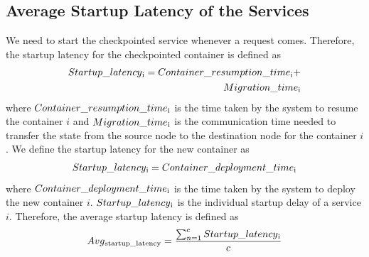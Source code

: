 \subsection{Average Startup Latency of the Services}
We need to start the checkpointed service whenever a
request comes. Therefore, the startup latency for the checkpointed container is defined as
\begin{align*} Startup\_latency\textsubscript{i} = Container\_resumption\_time\textsubscript{i}+
\\ Migration\_time\textsubscript{i}\end{align*}
where \begin{math} Container\_resumption\_time\textsubscript{i}\end{math} is the time taken by
the system to resume the container \begin{math} i \end{math} and \begin{math} Migration\_time\textsubscript{i} \end{math} is the communication time needed to transfer the state from
the source node to the destination node for the container \begin{math}i \end{math}. We define the startup latency for the new container as \begin{align*} Startup\_latency\textsubscript{i} = Container\_deployment\_time\textsubscript{i}\end{align*} where \begin{math} Container\_deployment\_time\textsubscript{i} \end{math} is the time taken by
the system to deploy the new container \begin{math} i \end{math}. \begin{math}Startup\_latency\textsubscript{i} \end{math} is the individual startup delay of a service \begin{math} i \end{math}. Therefore, the
average startup latency is defined as \begin{align*} Avg\textsubscript{startup\_latency} =\frac {\sum_{n=1}^{c} Startup\_latency\textsubscript{i}} {c} \end{align*}

